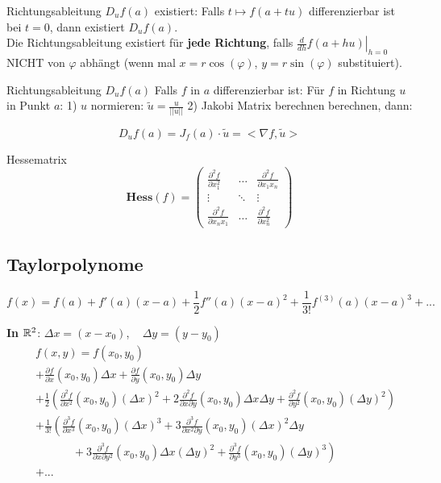\begin{Rezept}{Richtungsableitung $D_uf(a)$ existiert:}{} Falls $t \mapsto f(a + tu)$ differenzierbar ist bei $t=0$, dann existiert $D_uf(a)$.\\

	Die Richtungsableitung existiert für \textbf{jede Richtung}, falls $\left.\frac{d}{dh} f(a + hu) \right|_{h=0}$ NICHT von $\varphi$ abhängt (wenn mal $x=r\cos(\varphi)$, $y=r\sin(\varphi)$ substituiert).
\end{Rezept}

\begin{Rezept}{Richtungsableitung $D_u f(a)$}{}
Falls $f$ in $a$ differenzierbar ist: Für $f$ in Richtung $u$ in Punkt $a$: 1) $u$ normieren: $\tilde{u} = \frac{u}{||u||}$ 2) Jakobi Matrix berechnen berechnen, dann:

\[
    D_u f(a) = J_f(a) \cdot \tilde{u} = <\nabla f, \tilde{u}> 
\]
\end{Rezept}

\begin{Definition}{Hessematrix}{}
\[
    \mathbf{Hess}(f) =
        \begin{pmatrix}
            \frac{\partial^2 f}{\partial x_1^2}&\hdots&\frac{\partial^2 f}{\partial x_1 x_n}\\
            \vdots&\ddots&\vdots\\
            \frac{\partial^2 f}{\partial x_n x_1}&\hdots&\frac{\partial^2 f}{\partial x_n^2}
        \end{pmatrix}
\]
\end{Definition}

\subsection{Taylorpolynome}

\[
    f(x) = f(a) + f'(a)(x-a) + \frac{1}{2} f''(a)(x-a)^2 + \frac{1}{3!} f^{(3)}(a)(x-a)^3 + ...
\]

\textbf{In $\mathbb{R}^2$}: $\Delta x = (x - x_0)$, ~ $\Delta y = (y - y_0)$
\begin{align*}
    \; & f(x, y) =f(x_0, y_0)\\ &+ \frac{\partial f}{\partial x}(x_0,y_0) \Delta x + \frac{\partial f}{\partial y}(x_0,y_0) \Delta y\\
    &+ \frac{1}{2} \left(\frac{\partial^2 f}{\partial x^2}(x_0,y_0) (\Delta x)^2 + 2\frac{\partial^2 f}{\partial x \partial y}(x_0,y_0) \Delta x \Delta y + \frac{\partial^2 f}{\partial y^2}(x_0,y_0) (\Delta y)^2\right)\\
    &+ \frac{1}{3!} \left(\frac{\partial^3 f}{\partial x^3}(x_0,y_0) (\Delta x)^3 + 3\frac{\partial^3 f}{\partial x^2 \partial y}(x_0,y_0) (\Delta x)^2 \Delta y\right.\\
    &\quad\quad\quad\;+ \left.3\frac{\partial^3 f}{\partial x \partial y^2}(x_0,y_0) \Delta x (\Delta y)^2 + \frac{\partial^3 f}{\partial y^3}(x_0,y_0) (\Delta y)^3\right)\\
    & + ...
\end{align*}


